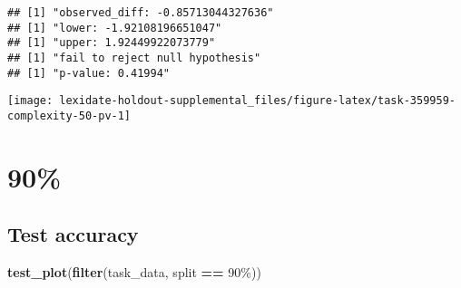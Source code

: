 \documentclass[
]{book}
\newenvironment{Shaded}{\begin{snugshade}}{\end{snugshade}}
\newcommand{\AttributeTok}[1]{\textcolor[rgb]{0.13,0.29,0.53}{#1}}
\newcommand{\DecValTok}[1]{\textcolor[rgb]{0.00,0.00,0.81}{#1}}
\newcommand{\FunctionTok}[1]{\textcolor[rgb]{0.13,0.29,0.53}{\textbf{#1}}}
\newcommand{\NormalTok}[1]{#1}
\newcommand{\OtherTok}[1]{\textcolor[rgb]{0.56,0.35,0.01}{#1}}
\newcommand{\SpecialCharTok}[1]{\textcolor[rgb]{0.81,0.36,0.00}{\textbf{#1}}}
\newcommand{\StringTok}[1]{\textcolor[rgb]{0.31,0.60,0.02}{#1}}
\begin{document}
\begin{Shaded}
\end{Shaded}

\begin{verbatim}
## [1] "observed_diff: -0.85713044327636"
## [1] "lower: -1.92108196651047"
## [1] "upper: 1.92449922073779"
## [1] "fail to reject null hypothesis"
## [1] "p-value: 0.41994"
\end{verbatim}

\texttt{[image: lexidate-holdout-supplemental\_files/figure-latex/task-359959-complexity-50-pv-1]}

\hypertarget{section-38}{%
\section{90\%}\label{section-38}}

\hypertarget{test-accuracy-38}{%
\subsection{Test accuracy}\label{test-accuracy-38}}

\begin{Shaded}
\begin{Highlighting}[]
\FunctionTok{test\_plot}\NormalTok{(}\FunctionTok{filter}\NormalTok{(task\_data, split }\SpecialCharTok{==} \StringTok{\textquotesingle{}90\%\textquotesingle{}}\NormalTok{))}
\end{Highlighting}
\end{Shaded}
\end{document}
